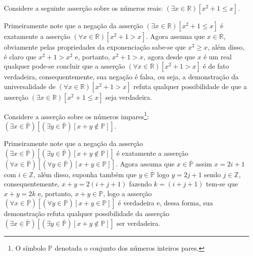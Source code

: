 \begin{exemplo}\label{exe:Refutacao4}
	Considere a seguinte asserção sobre os números reais: $(\exists x \in \mathbb{R})[x^2 + 1 \leq x]$.
	
	\begin{refute}
		Primeiramente note que a negação da asserção $(\exists x \in \mathbb{R})[x^2 + 1 \leq x]$ é exatamente a asserção $(\forall x \in \mathbb{R})[x^2 + 1 > x]$. Agora assuma que $x \in \mathbb{R}$, obviamente pelas propriedades da exponenciação sabe-se que $x^2 \geq x$, além disso, é claro que $x^2 + 1 > x^2$ e, portanto, $x^2 + 1 > x$, agora desde que $x$ é um real qualquer pode-se concluir que a asserção $(\forall x \in \mathbb{R})[x^2 + 1 > x]$ é de fato verdadeira, consequentemente, sua negação é falsa, ou seja, a demonstração da universalidade de $(\forall x \in \mathbb{R})[x^2 + 1 > x]$ refuta qualquer possibilidade de que a asserção $(\exists x \in \mathbb{R})[x^2 + 1 \leq x]$ seja verdadeira.
	\end{refute} 
\end{exemplo}

\begin{exemplo}\label{exe:Refutacao5}
	Considere a asserção sobre os números impares\footnote{O símbolo $\mathbb{P}$ denotada o conjunto dos números inteiros pares.}: $(\exists x \in \overline{\mathbb{P}})[(\exists y \in \overline{\mathbb{P}})[x + y \notin \mathbb{P}]]$.
	
	\begin{refute}
    Primeiramente note que a negação da asserção $(\exists x \in \overline{\mathbb{P}})[(\exists y \in \overline{\mathbb{P}})[x + y \notin \mathbb{P}]]$ é exatamente a asserção $(\forall x \in \overline{\mathbb{P}})[(\forall y \in \overline{\mathbb{P}})[x + y \in \mathbb{P}]]$. Agora assuma que $x \in \overline{\mathbb{P}}$ assim $x = 2i + 1$ com $i \in \mathbb{Z}$, além disso, suponha também que $y \in \overline{\mathbb{P}}$ logo $y = 2j + 1$ sendo $j \in \mathbb{Z}$, consequentemente, $x + y = 2(i + j + 1)$ fazendo $k = (i + j + 1)$ tem-se que $x + y = 2k$ e, portanto, $x + y \in \mathbb{P}$, logo a asserção $(\forall x \in \overline{\mathbb{P}})[(\forall y \in \overline{\mathbb{P}})[x + y \in \mathbb{P}]]$ é verdadeira e, dessa forma, sua demonstração refuta qualquer possibilidade da asserção $(\exists x \in \overline{\mathbb{P}})[(\exists y \in \overline{\mathbb{P}})[x + y \notin \mathbb{P}]]$ ser verdadeira.
	\end{refute} 
\end{exemplo}

